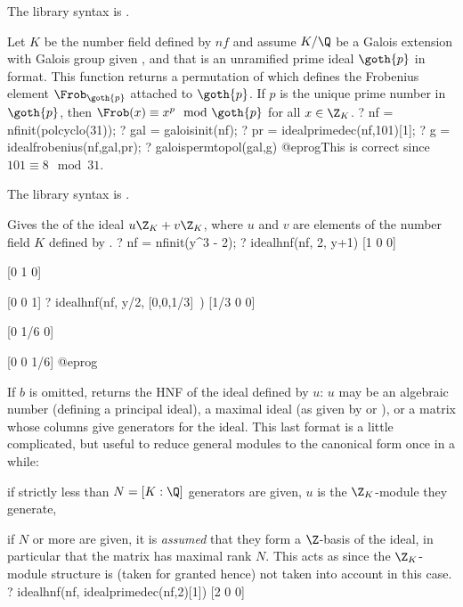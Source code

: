 The library syntax is .

\label{se:idealfrobenius}
Let $K$ be the number field defined by $nf$ and assume $K/\Q$ be a
Galois extension with Galois group given ,
and that  is an unramified prime ideal $\goth{p}$ in 
format.
This function returns a permutation of  which defines
the Frobenius element $\Frob_{\goth{p}}$ attached to $\goth{p}$.
If $p$ is the unique prime number in $\goth{p}$, then
$\Frob(x)\equiv x^p\mod\goth{p}$ for all $x\in\Z_K$.
\bprog
? nf = nfinit(polcyclo(31));
? gal = galoisinit(nf);
? pr = idealprimedec(nf,101)[1];
? g = idealfrobenius(nf,gal,pr);
? galoispermtopol(gal,g)
@eprog\noindent This is correct since $101\equiv 8\mod{31}$.

The library syntax is .

\label{se:idealhnf}
Gives the  of the ideal $u\Z_K+v\Z_K$, where $u$
and $v$ are elements of the number field $K$ defined by .
\bprog
? nf = nfinit(y^3 - 2);
? idealhnf(nf, 2, y+1)
[1 0 0]

[0 1 0]

[0 0 1]
? idealhnf(nf, y/2, [0,0,1/3]~)
[1/3 0 0]

[0 1/6 0]

[0 0 1/6]
@eprog

If $b$ is omitted, returns the HNF of the ideal defined by $u$: $u$ may be an
algebraic number (defining a principal ideal), a maximal ideal (as given by
 or ), or a matrix whose columns give
generators for the ideal. This last format is a little complicated, but
useful to reduce general modules to the canonical form once in a while:

\item if strictly less than $N = [K:\Q]$ generators are given, $u$
is the $\Z_K$-module they generate,

\item if $N$ or more are given, it is \emph{assumed} that they form a
$\Z$-basis of the ideal, in particular that the matrix has maximal rank $N$.
This acts as  since the $\Z_K$-module structure is (taken for
granted hence) not taken into account in this case.
\bprog
? idealhnf(nf, idealprimedec(nf,2)[1])
[2 0 0]


